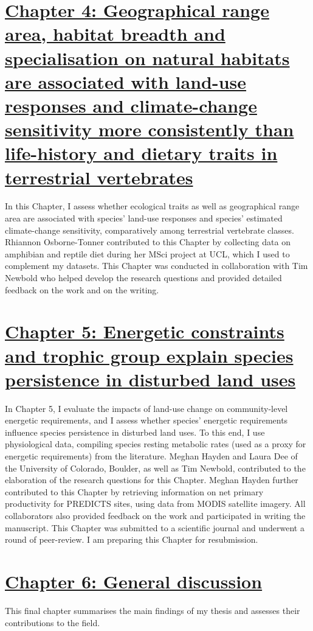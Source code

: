 \section*{\hyperref[sec:4]{Chapter 4: Geographical range area, habitat breadth and specialisation on natural habitats are associated with land-use responses and climate-change sensitivity more consistently than life-history and dietary traits in terrestrial vertebrates}}
In this Chapter, I assess whether ecological traits as well as geographical range area are associated with species' land-use responses and species' estimated climate-change sensitivity, comparatively among terrestrial vertebrate classes. Rhiannon Osborne-Tonner contributed to this Chapter by collecting data on amphibian and reptile diet during her MSci project at UCL, which I used to complement my datasets. This Chapter was conducted in collaboration with Tim Newbold who helped develop the research questions and provided detailed feedback on the work and on the writing.  %

\section*{\hyperref[sec:5]{Chapter 5: Energetic constraints and trophic group explain species persistence in disturbed land uses}}
In Chapter 5, I evaluate the impacts of land-use change on community-level energetic requirements, and I assess whether species' energetic requirements influence species persistence in disturbed land uses. To this end, I use physiological data, compiling species resting metabolic rates (used as a proxy for energetic requirements) from the literature. Meghan Hayden and Laura Dee of the University of Colorado, Boulder, as well as Tim Newbold, contributed to the elaboration of the research questions for this Chapter. Meghan Hayden further contributed to this Chapter by retrieving information on net primary productivity for PREDICTS sites, using data from MODIS satellite imagery. All collaborators also provided feedback on the work and participated in writing the manuscript. This Chapter was submitted to a scientific journal and underwent a round of peer-review. I am preparing this Chapter for resubmission.

\section*{\hyperref[sec:6]{Chapter 6: General discussion}}
This final chapter summarises the main findings of my thesis and assesses their contributions to the field.